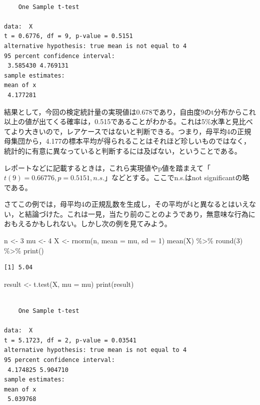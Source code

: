 \documentclass[
  a4paper,
]{ltjsbook}
\newenvironment{Shaded}{\begin{snugshade}}{\end{snugshade}}
\newcommand{\AttributeTok}[1]{\textcolor[rgb]{0.40,0.45,0.13}{#1}}
\newcommand{\DecValTok}[1]{\textcolor[rgb]{0.68,0.00,0.00}{#1}}
\newcommand{\FunctionTok}[1]{\textcolor[rgb]{0.28,0.35,0.67}{#1}}
\newcommand{\NormalTok}[1]{\textcolor[rgb]{0.00,0.23,0.31}{#1}}
\newcommand{\OtherTok}[1]{\textcolor[rgb]{0.00,0.23,0.31}{#1}}
\newcommand{\SpecialCharTok}[1]{\textcolor[rgb]{0.37,0.37,0.37}{#1}}
\begin{document}
\begin{verbatim}

    One Sample t-test

data:  X
t = 0.6776, df = 9, p-value = 0.5151
alternative hypothesis: true mean is not equal to 4
95 percent confidence interval:
 3.585430 4.769131
sample estimates:
mean of x 
 4.177281 
\end{verbatim}

結果として，今回の検定統計量の実現値は0.678であり，自由度9のt分布からこれ以上の値が出てくる確率は，0.515であることがわかる。これは5\%水準と見比べてより大きいので，レアケースではないと判断できる。つまり，母平均4の正規母集団から，4.177の標本平均が得られることはそれほど珍しいものではなく，統計的に有意に異なっていると判断するには及ばない，ということである。

レポートなどに記載するときは，これら実現値やp値を踏まえて「\(t(9)=0.66776,p=0.5151 ,n.s.\)」などとする。ここでn.s.はnot
significantの略である。

さてこの例では，母平均4の正規乱数を生成し，その平均が4と異なるとはいえない，と結論づけた。これは一見，当たり前のことのようであり，無意味な行為におもえるかもしれない。しかし次の例を見てみよう。

\begin{Shaded}
\begin{Highlighting}[]
\NormalTok{n }\OtherTok{\textless{}{-}} \DecValTok{3}
\NormalTok{mu }\OtherTok{\textless{}{-}} \DecValTok{4}
\NormalTok{X }\OtherTok{\textless{}{-}} \FunctionTok{rnorm}\NormalTok{(n, }\AttributeTok{mean =}\NormalTok{ mu, }\AttributeTok{sd =} \DecValTok{1}\NormalTok{)}
\FunctionTok{mean}\NormalTok{(X) }\SpecialCharTok{\%\textgreater{}\%}
  \FunctionTok{round}\NormalTok{(}\DecValTok{3}\NormalTok{) }\SpecialCharTok{\%\textgreater{}\%}
  \FunctionTok{print}\NormalTok{()}
\end{Highlighting}
\end{Shaded}

\begin{verbatim}
[1] 5.04
\end{verbatim}

\begin{Shaded}
\begin{Highlighting}[]
\NormalTok{result }\OtherTok{\textless{}{-}} \FunctionTok{t.test}\NormalTok{(X, }\AttributeTok{mu =}\NormalTok{ mu)}
\FunctionTok{print}\NormalTok{(result)}
\end{Highlighting}
\end{Shaded}

\begin{verbatim}

    One Sample t-test

data:  X
t = 5.1723, df = 2, p-value = 0.03541
alternative hypothesis: true mean is not equal to 4
95 percent confidence interval:
 4.174825 5.904710
sample estimates:
mean of x 
 5.039768 
\end{verbatim}
\end{document}
